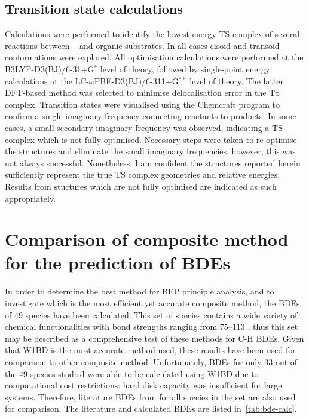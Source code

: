\subsection{Transition state calculations}

Calculations were performed to identify the lowest energy TS complex of several reactions between \cumo~ and organic substrates. In all cases cisoid and transoid conformations were explored. All optimisation calculations were performed at the B3LYP-D3(BJ)/6-31+G$^*$ level of theory, followed by single-point energy calculations at the LC-$\omega$PBE-D3(BJ)/6-311+G$^{**}$ level of theory. The latter DFT-based method was selected to minimise delocalisation error in the TS complex.\cite{OterodelaRoza2014} Transition states were visualised using the Chemcraft program\cite{ccraft} to confirm a single imaginary frequency connecting reactants to products. In some cases, a small secondary imaginary frequency was observed, indicating a TS complex which is not fully optimised. Necessary steps were taken to re-optimise the structures and eliminate the small imaginary frequencies, however, this was not always successful. Nonetheless, I am confident the structures reported herein sufficiently represent the true TS complex geometries and relative energies. Results from stuctures which are not fully optimised are indicated as such appropriately.

\section{Comparison of composite method for the prediction of BDEs}
In order to determine the best method for BEP principle analysis, and to investigate which is the most efficient yet accurate composite method, the BDEs of 49 species have been calculated. This set of species contains a wide variety of chemical functionalities with bond strengths ranging from 75--113 \kcalmol, thus this set may be described as a comprehensive test of these methods for C-H BDEs. Given that W1BD is the most accurate method used, these results have been used for comparison to other composite method. Unfortunately, BDEs for only 33 out of the 49 species studied were able to be calculated using W1BD due to computational cost restrictions: hard disk capacity was insufficient for large systems. Therefore, literature BDEs from \citet{Luo2002} for all species in the set are also used for comparison. The literature and calculated BDEs are listed in~\ref{tab:bde-calc}.

